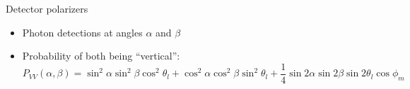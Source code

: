 \documentclass{../talk}
\begin{document}
\begin{frame}{Detector polarizers}
  \begin{itemize}
    \item Photon detections at angles $\alpha$ and $\beta$
    \item Probability of both being ``vertical'':
      \begin{equation}
        P_{VV}(\alpha, \beta) = \sin^2\alpha \sin^2\beta \cos^2\theta_l + \cos^2\alpha \cos^2\beta \sin^2\theta_l + \frac{1}{4} \sin2\alpha \sin2\beta \sin2\theta_l \cos\phi_m
      \end{equation}
  \end{itemize}
  \begin{figure}
    \centering
    \caption{}
  \end{figure}
\end{frame}

\end{document}
